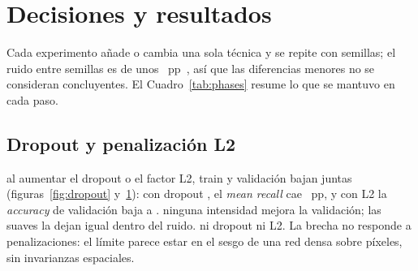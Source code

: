 \section{Decisiones y resultados}
Cada experimento añade o cambia una sola técnica y se repite con  semillas; el ruido entre semillas
es de unos ~pp~\cite{bouthillier}, así que las diferencias menores no se consideran
concluyentes. El Cuadro~\ref{tab:phases} resume lo que se mantuvo en cada paso.

\begin{table}[h]
  \centering\small
  \caption{Configuración que se mantiene tras cada paso (validación; media $\pm$ desviación típica).}
  \label{tab:phases}
\end{table}

\subsection{Dropout y penalización L2}
{al aumentar el dropout o el factor L2, train y validación bajan juntas (figuras~\ref{fig:dropout} y~\ref{fig:l2}): con dropout
, el \emph{mean recall} cae ~pp, y con L2  la
\emph{accuracy} de validación baja a .}
{ninguna intensidad mejora la validación; las suaves la dejan igual dentro del ruido.}
{ni dropout ni L2. La brecha no responde a penalizaciones: el límite parece estar en el sesgo de una red densa sobre
píxeles, sin invarianzas espaciales.}

\begin{figure}[!htbp]
  \centering
  \begin{minipage}[t]{0.485\linewidth}
    \centering
    \caption{}
    \label{fig:dropout}
  \end{minipage}\hfill
  \begin{minipage}[t]{0.485\linewidth}
    \centering
    \caption{}
    \label{fig:l2}
  \end{minipage}
\end{figure}

